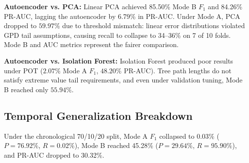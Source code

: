 \documentclass[conference]{IEEEtran}
\begin{document}
\begin{table}[htbp]
\centering
\caption{Model Ablation and Chronological Evaluation on BGL}
\label{tab:ablation_results}
\end{table}

\textbf{Autoencoder vs. PCA:} Linear PCA achieved 85.50\% Mode B $F_1$ and 84.26\% PR-AUC, lagging the autoencoder by 6.79\% in PR-AUC. Under Mode A, PCA dropped to $59.97\%$ due to threshold mismatch: linear error distributions violated GPD tail assumptions, causing recall to collapse to 34--36\% on 7 of 10 folds. Mode B and AUC metrics represent the fairer comparison.

\textbf{Autoencoder vs. Isolation Forest:} Isolation Forest produced poor results under POT ($2.07\%$ Mode A $F_1$, $48.20\%$ PR-AUC). Tree path lengths do not satisfy extreme value tail requirements, and even under validation tuning, Mode B reached only $55.94\%$.

\subsection{Temporal Generalization Breakdown}
Under the chronological 70/10/20 split, Mode A $F_1$ collapsed to 0.03\% ($P=76.92\%$, $R=0.02\%$), Mode B reached 45.28\% ($P=29.64\%$, $R=95.90\%$), and PR-AUC dropped to 30.32\%.
\end{document}
